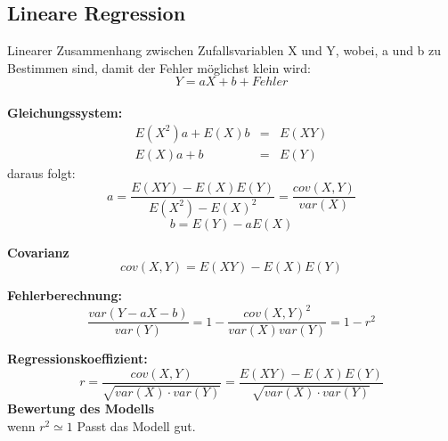 \documentclass[margin=normal]{tex/hsrzf}
\begin{document}
\newpage
\subsection{Lineare Regression}
\begin{multicols}{2}


    \noindent Linearer Zusammenhang zwischen Zufallsvariablen X und Y,     wobei, a und b zu Bestimmen sind, damit der Fehler möglichst klein wird:
    $$ Y = aX + b + Fehler$$
    \\ \textbf{Gleichungssystem:}
    \begin{eqnarray*}E(X^2)a + E(X)b& =& E(XY) \\ E(X)a + b & = & E(Y)\end{eqnarray*}
    daraus folgt:
    $$a= \frac{E(XY)- E(X)E(Y)}{E(X^2) - E(X)^2} = \frac{cov(X,Y)}{var(X)}$$
    $$b= E(Y) - aE(X)$$

    \noindent\textbf{Covarianz}\\
    $$cov(X,Y) = E(XY) - E(X)E(Y)$$

    \noindent\textbf{Fehlerberechnung:}
    $$\frac{var(Y-aX-b)}{var(Y)} = 1- \frac{cov(X,Y)^2}{var(X)var(Y)} = 1 -r^2 $$

    \noindent\textbf{Regressionskoeffizient:}
    $$r = \frac{cov(X,Y)}{\sqrt{var(X) \cdot var(Y)}} = \frac{E(XY) - E(X)E(Y)}{\sqrt{var(X) \cdot var(Y)}}$$
    \noindent\textbf{Bewertung des Modells} \\
    wenn $r^2 \simeq  1$ Passt das Modell gut.
\end{multicols}
\end{document}
